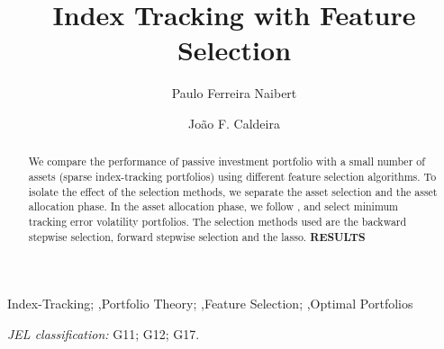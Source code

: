 \documentclass[preprint, doubleblind, authoryear,10pt]{elsarticle}
\begin{document}

\begin{frontmatter}

\title{Index Tracking with Feature Selection}%

\author[Label1]{Paulo Ferreira Naibert}
\author[Label2]{Jo\~ao F. Caldeira}
\address[Label1]{PhD Candidate at the Economics Department of the Federal University of Rio Grande do Sul}
\address[Label2]{Department of Economics, Universidade Federal de Santa Catarina}

\begin{abstract}
\noindent
We compare the performance of passive investment portfolio with a small number of assets (sparse index-tracking portfolios) using different feature selection algorithms.
To isolate the effect of the selection methods, we separate the asset selection and the asset allocation phase.
In the asset allocation phase, we follow \cite{liu-2009}, and select minimum tracking error volatility portfolios.
The selection methods used are the backward stepwise selection, forward stepwise selection and the lasso.
\textbf{RESULTS}
\end{abstract}


\begin{keyword}
Index-Tracking; \sep Portfolio Theory; \sep Feature Selection; \sep Optimal Portfolios 

\noindent\textit{JEL classification:} G11; G12; G17.
\end{keyword}

\end{frontmatter}

\clearpage

\end{document}
